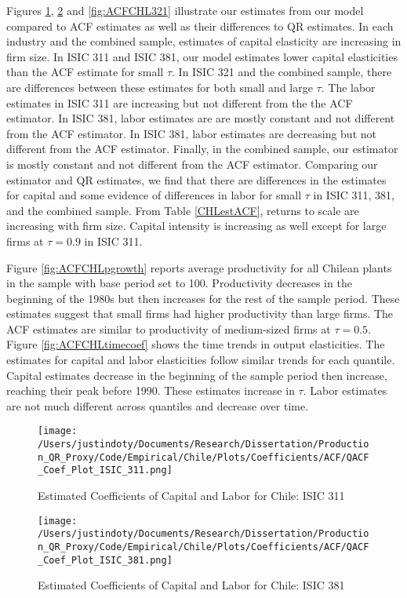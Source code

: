 \documentclass[11pt]{article}
\begin{document}
Figures \ref{fig:ACFCHL311}, \ref{fig:ACFCHL381} and \ref{fig:ACFCHL321} illustrate our estimates from our model compared to ACF estimates as well as their differences to QR estimates. In each industry and the combined sample, estimates of capital elasticity are increasing in firm size. In ISIC 311 and ISIC 381, our model estimates lower capital elasticities than the ACF estimate for small $\tau$. In ISIC 321 and the combined sample, there are differences between these estimates for both small and large $\tau$. The labor estimates in ISIC 311 are increasing but not different from the the ACF estimator. In ISIC 381, labor estimates are are mostly constant and not different from the ACF estimator. In ISIC 381, labor estimates are decreasing but not different from the ACF estimator. Finally, in the combined sample, our estimator is mostly constant and not different from the ACF estimator. Comparing our estimator and QR estimates, we find that there are differences in the estimates for capital and some evidence of differences in labor for small $\tau$ in ISIC 311, 381, and the combined sample. From Table \ref{CHLestACF}, returns to scale are increasing with firm size. Capital intensity is increasing as well except for large firms at $\tau=0.9$ in ISIC 311.

Figure \ref{fig:ACFCHLpgrowth} reports average productivity for all Chilean plants in the sample with base period set to 100. Productivity decreases in the beginning of the 1980s but then increases for the rest of the sample period. These estimates suggest that small firms had higher productivity than large firms. The ACF estimates are similar to productivity of medium-sized firms at $\tau=0.5$. Figure \ref{fig:ACFCHLtimecoef} shows the time trends in output elasticities. The estimates for capital and labor elasticities follow similar trends for each quantile. Capital estimates decrease in the beginning of the sample period then increase, reaching their peak before 1990. These estimates increase in $\tau$. Labor estimates are not much different across quantiles and decrease over time.

\begin{figure}[H]
\centering
\caption{Estimated Coefficients of Capital and Labor for Chile: ISIC 311}
\texttt{[image: /Users/justindoty/Documents/Research/Dissertation/Production\_QR\_Proxy/Code/Empirical/Chile/Plots/Coefficients/ACF/QACF\_Coef\_Plot\_ISIC\_311.png]}
\label{fig:ACFCHL311}
\end{figure}

\begin{figure}[H]
\centering
\caption{Estimated Coefficients of Capital and Labor for Chile: ISIC 381}
\texttt{[image: /Users/justindoty/Documents/Research/Dissertation/Production\_QR\_Proxy/Code/Empirical/Chile/Plots/Coefficients/ACF/QACF\_Coef\_Plot\_ISIC\_381.png]}
\label{fig:ACFCHL381}
\end{figure}
\end{document}
